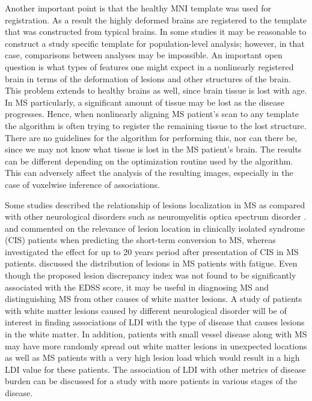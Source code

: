 \documentclass[10pt]{article}
\begin{document}
Another important point is that the healthy MNI template was used for registration. As a result the highly deformed brains are registered to the template that was constructed from typical brains. In some studies it may be reasonable to construct a study specific template for population-level analysis; however, in that case, comparisons between analyses may be impossible. An important open question is what types of features one might expect in a nonlinearly registered brain in terms of the deformation of lesions and other structures of the brain. This problem extends to healthy brains as well, since brain tissue is lost with age. In MS particularly, a significant amount of tissue may be lost as the disease progresses. Hence, when nonlinearly aligning MS patient's scan to any template the algorithm is often trying to register the remaining tissue to the lost structure. There are no guidelines for the algorithm for performing this, nor can there be, since we may not know what tissue is lost in the MS patient's brain. The results can be different depending on the optimization routine used by the algorithm. This can adversely affect the analysis of the resulting images, especially in the case of voxelwise inference of associations. 

Some studies described the relationship of lesions localization in MS as compared with other neurological disorders such as neuromyelitis optica spectrum disorder \cite{matthews2013distinction}. \cite{giorgio2013location} and \cite{charil2013predicting} commented on the relevance of lesion location in clinically isolated syndrome (CIS) patients when predicting the short-term conversion to MS, whereas \cite{dalton2012brain} investigated the effect for up to 20 years period after presentation of CIS in MS patients. \cite{riccitelli2011voxelwise} discussed the distribution of lesions in MS patients with fatigue. Even though the proposed lesion discrepancy index was not found to be significantly associated with the EDSS score, it may be useful in diagnosing MS and distinguishing MS from other causes of white matter lesions. A study of patients with white matter lesions caused by different neurological disorder will be of interest in finding associations of LDI with the type of disease that causes lesions in the white matter. In addition, patients with small vessel disease along with MS may have more randomly spread out white matter lesions in unexpected locations as well as MS patients with a very high lesion load which would result in a high LDI value for these patients. The association of LDI with other metrics of disease burden can be discussed for a study with more patients in various stages of the disease. 
\end{document}
